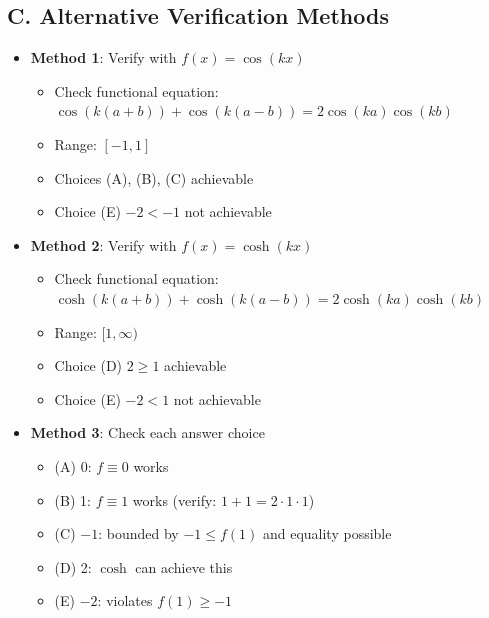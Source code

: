 \documentclass[12pt]{article}
\begin{document}
\begin{verificationbox}
\subsection*{C. Alternative Verification Methods}
\begin{itemize}[leftmargin=*]
    \item \textbf{Method 1}: Verify with $f(x) = \cos(kx)$
    \begin{itemize}
        \item Check functional equation: $\cos(k(a+b)) + \cos(k(a-b)) = 2\cos(ka)\cos(kb)$ \checkmark
        \item Range: $[-1, 1]$
        \item Choices (A), (B), (C) achievable \checkmark
        \item Choice (E) $-2 < -1$ not achievable \checkmark
    \end{itemize}
    \item \textbf{Method 2}: Verify with $f(x) = \cosh(kx)$
    \begin{itemize}
        \item Check functional equation: $\cosh(k(a+b)) + \cosh(k(a-b)) = 2\cosh(ka)\cosh(kb)$ \checkmark
        \item Range: $[1, \infty)$
        \item Choice (D) $2 \geq 1$ achievable \checkmark
        \item Choice (E) $-2 < 1$ not achievable \checkmark
    \end{itemize}
    \item \textbf{Method 3}: Check each answer choice
    \begin{itemize}
        \item (A) 0: $f \equiv 0$ works \checkmark
        \item (B) 1: $f \equiv 1$ works (verify: $1 + 1 = 2 \cdot 1 \cdot 1$) \checkmark
        \item (C) $-1$: bounded by $-1 \leq f(1)$ and equality possible \checkmark
        \item (D) 2: $\cosh$ can achieve this \checkmark
        \item (E) $-2$: violates $f(1) \geq -1$ \checkmark
    \end{itemize}
\end{itemize}
\end{verificationbox}
\end{document}
